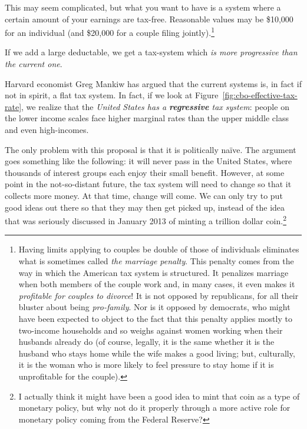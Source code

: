 This may seem complicated, but what you want to have is a system where a
certain amount of your earnings are tax-free. Reasonable values may be \$10,000
for an individual (and \$20,000 for a couple filing jointly).\footnote{Having
limits applying to couples be double of those of individuals eliminates what is
sometimes called \emph{the marriage penalty}. This penalty comes from the way
in which the American tax system is structured. It penalizes marriage when both
members of the couple work and, in many cases, it even makes it
\emph{profitable for couples to divorce}! It is not opposed by republicans, for
all their bluster about being \emph{pro-family}. Nor is it opposed by
democrats, who might have been expected to object to the fact that this penalty
applies mostly to two-income households and so weighs against women working
when their husbands already do (of course, legally, it is the same whether it
is the husband who stays home while the wife makes a good living; but,
culturally, it is the woman who is more likely to feel pressure to stay home if
it is unprofitable for the couple).}

If we add a large deductable, we get a tax-system which \emph{is more
progressive than the current one}.

Harvard economist Greg Mankiw has argued that the current systems is, in fact
if not in spirit, a flat tax system.
In fact, if we look at Figure~\ref{fig:cbo-effective-tax-rate}, we realize that
the \emph{United States has a \textbf{regressive} tax system}: people on the
lower income scales face higher marginal rates than the upper middle class and
even high-incomes.

The only problem with this proposal is that it is politically naïve. The
argument goes something like the following: it will never pass in the United
States, where thousands of interest groups each enjoy their small benefit.
However, at some point in the not-so-distant future, the tax system will need
to change so that it collects more money. At that time, change will come. We
can only try to put good ideas out there so that they may then get picked up,
instead of the idea that was seriously discussed in January 2013 of minting a
trillion dollar coin.\footnote{I actually think it might have been a good idea
to mint that coin as a type of monetary policy, but why not do it properly
through a more active role for monetary policy coming from the Federal
Reserve?}

